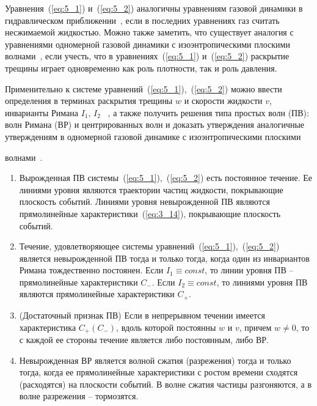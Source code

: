 Уравнения~(\ref{eq:5_1}) и~(\ref{eq:5_2}) аналогичны уравнениям газовой динамики в гидравлическом приближении~\cite{Zver_smirn1}, если в последних уравнениях газ считать несжимаемой жидкостью. Можно также заметить, что существует аналогия с уравнениями одномерной газовой динамики с изоэнтропическими плоскими волнами~\cite{rozhd1,ovsyan1,Chern1}, если учесть, что в уравнениях~(\ref{eq:5_1}) и~(\ref{eq:5_2}) раскрытие трещины играет одновременно как роль плотности, так и роль давления. 

Применительно к системе уравнений~(\ref{eq:5_1}),~(\ref{eq:5_2}) можно ввести определения в терминах раскрытия трещины $w$ и скорости жидкости $v$, инварианты Римана $I_1,\, I_2$ ~\cite{pedli1}, а также получить решения типа простых волн (ПВ): волн Римана (ВР) и центрированных волн и доказать утверждения аналогичные утверждениям в одномерной газовой динамике с изоэнтропическими плоскими 

волнами~\cite{ovsyan1}.

\begin{enumerate}

	\item Вырожденная ПВ системы~(\ref{eq:5_1}),~(\ref{eq:5_2}) есть постоянное течение. Ее линиями уровня являются траектории частиц жидкости, покрывающие плоскость событий. Линиями уровня невырожденной ПВ являются прямолинейные характеристики~(\ref{eq:3_14}), покрывающие плоскость событий.

	\item Течение, удовлетворяющее системы уравнений~(\ref{eq:5_1}),~(\ref{eq:5_2}) является невырожденной ПВ тогда и только тогда, когда один из инвариантов Римана тождественно постоянен. Если $I_1 \equiv const$, то линии уровня ПВ – прямолинейные характеристики $C_-$. Если $I_2 \equiv const$, то линиями уровня ПВ являются прямолинейные характеристики $C_+$.

	\item (Достаточный признак ПВ) Если в непрерывном течении имеется характеристика $C_+\left(C_-\right)$, вдоль которой постоянны $w$ и $v$, причем $w \neq 0$, то с каждой ее стороны течение является либо постоянным, либо ВР.

	\item Невырожденная ВР является волной сжатия (разрежения) тогда и только тогда, когда ее прямолинейные характеристики с ростом времени сходятся (расходятся) на плоскости событий. В волне сжатия частицы разгоняются, а в волне разрежения – тормозятся.

\end{enumerate}



